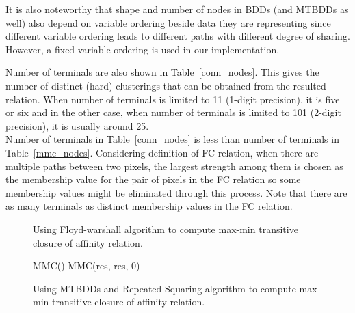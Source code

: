 \documentclass[4pt]{article}
\begin{document}
It is also noteworthy that shape and number of nodes in BDDs (and MTBDDs as well) also depend on variable ordering beside data they are representing since different variable ordering leads to different paths with different degree of sharing. However, a fixed variable ordering is used in our implementation.

Number of terminals are also shown in Table~\ref{conn_nodes}. This gives the number of distinct (hard) clusterings that can be obtained from the resulted relation. When number of terminals is limited to 11 (1-digit precision), it is five or six and in the other case, when number of terminals is limited to 101 (2-digit precision), it is usually around 25.\\
Number of terminals in Table~\ref{conn_nodes} is less than number of terminals in Table~\ref{mmc_nodes}. Considering definition of FC relation, when there are multiple paths between two pixels, the largest strength among them is chosen as the membership value for the pair of pixels in the FC relation so some membership values might be eliminated through this process. Note that there are as many terminals as distinct membership values in the FC relation.



\begin{figure}[ht]

\begin{algorithmic}[1]
      \State 
    \EndFor
   \EndFor
\EndFor

\end{algorithmic}
\caption{Using Floyd-warshall algorithm to compute max-min transitive closure of affinity relation.}
\label{floyd}
\end{figure}

\begin{figure}[ht]  
\begin{algorithmic}[1]
\State 
\Repeat 
  \State 
  \State  MMC() \Comment MMC(res, res, 0)
\Until{}
\end{algorithmic}
\begin{comment}
\begin{verbatim}
/* At the end, res would be a MTBDD that represent the fuzzy connectedness
   relation.
*/
res = affinity;
do 
  old = res;
  res = mmc(res, res); /* i.e. mmc(res, res, 0) */
while (res != old)
\end{verbatim}
\end{comment}
\caption{Using MTBDDs and Repeated Squaring algorithm to compute max-min transitive closure of affinity relation.}
\label{repeated_mmc}
\end{figure}
\end{document}
